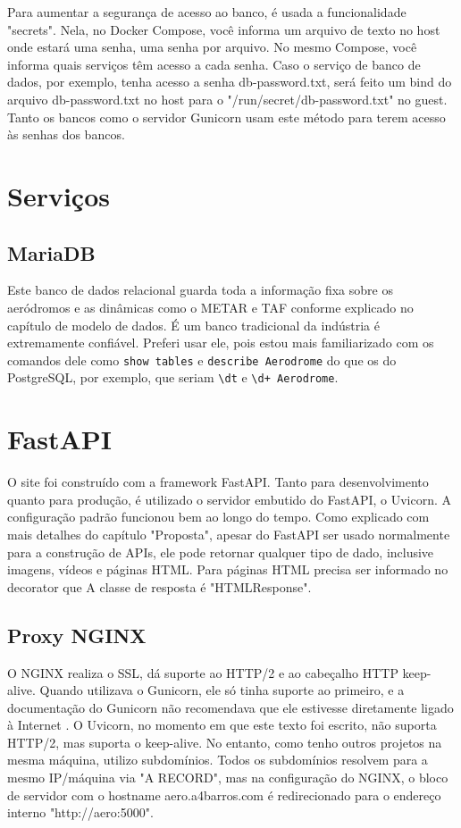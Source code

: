 Para aumentar a segurança de acesso ao banco, é usada a funcionalidade "secrets". Nela, no Docker Compose,
você informa um arquivo de texto no host onde estará uma senha, uma senha por arquivo. No mesmo Compose,
você informa quais serviços têm acesso a cada senha. Caso o serviço de banco de dados, por exemplo, tenha
acesso a senha db-password.txt, será feito um bind do arquivo db-password.txt no host para o "/run/secret/db-password.txt"
no guest.
Tanto os bancos como o servidor Gunicorn usam este método para terem acesso às senhas dos bancos.

\section{Serviços}

\subsection{MariaDB}
Este banco de dados relacional guarda toda a informação fixa sobre os aeródromos e as dinâmicas
como o METAR e TAF conforme explicado no capítulo de modelo de dados. É um banco tradicional
da indústria é extremamente confiável. Preferi usar ele, pois estou mais familiarizado com 
os comandos dele como \texttt{show tables} e \texttt{describe Aerodrome} do que os do PostgreSQL,
por exemplo, que seriam \texttt{\textbackslash dt} e \texttt{\textbackslash d+ Aerodrome}.

\section{FastAPI}

O site foi construído com a framework FastAPI. Tanto para desenvolvimento quanto para produção, 
é utilizado o servidor embutido do FastAPI, o Uvicorn. A configuração padrão funcionou bem ao
longo do tempo. Como explicado com mais detalhes do capítulo "Proposta", apesar do FastAPI ser
usado normalmente para a construção de APIs, ele pode retornar qualquer tipo de dado, inclusive
imagens, vídeos e páginas HTML. Para páginas HTML precisa ser informado no decorator que A
classe de resposta é "HTMLResponse".



\subsection{Proxy NGINX}
O NGINX realiza o SSL, dá suporte ao HTTP/2 e ao cabeçalho HTTP keep-alive. Quando
utilizava o Gunicorn, ele só tinha suporte ao primeiro, e a documentação do Gunicorn não
recomendava que ele estivesse diretamente ligado à Internet \cite{nginx-gunicorn}. O Uvicorn,
no momento em que este texto foi escrito, não suporta HTTP/2, mas suporta o keep-alive. No
entanto, como tenho outros projetos na mesma máquina, utilizo subdomínios. Todos os subdomínios
resolvem para a mesmo IP/máquina via "A RECORD", mas na configuração
do NGINX, o bloco de servidor com o hostname aero.a4barros.com é redirecionado para o
endereço interno "http://aero:5000".


